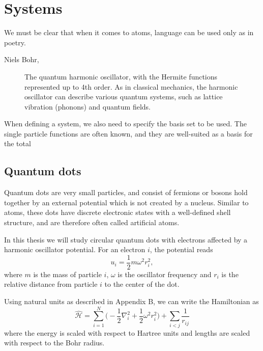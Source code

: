 \chapter{Systems} \label{chp:systems}
\epigraph{We must be clear that when it comes to atoms, language can be used only as in poetry.}{Niels Bohr, \cite{heisenberg_physics_1971}}
\begin{figure}[H]
	\centering
	
	\caption{The quantum harmonic oscillator, with the Hermite functions represented up to 4th order. As in classical mechanics, the harmonic oscillator can describe various quantum systems, such as lattice vibration (phonons) and quantum fields.}
	\label{fig:harmonicoscillator}
\end{figure}

When defining a system, we also need to specify the basis set to be used. The single particle functions are often known, and they are well-suited as a basis for the total

\newpage
\section{Quantum dots} \label{sec:quantumdots}
Quantum dots are very small particles, and consist of fermions or bosons hold together by an external potential which is not created by a nucleus. Similar to atoms, these dots have discrete electronic states with a well-defined shell structure, and are therefore often called artificial atoms. 

In this thesis we will study circular quantum dots with electrons affected by a harmonic oscillator potential. For an electron $i$, the potential reads
\begin{equation}
u_i=\frac{1}{2}m\omega^2r_i^2,
\end{equation}
where $m$ is the mass of particle $i$, $\omega$ is the oscillator frequency and $r_i$ is the relative distance from particle $i$ to the center of the dot. 

Using natural units as described in Appendix B, we can write the Hamiltonian as
\begin{equation}
\label{eq:HOHamiltonian}
\hat{\mathcal{H}} = \sum_{i=1}^{N} \Big(-\frac{1}{2} \nabla_i^2 + \frac{1}{2} \omega^2r_i ^2\Big) + \sum_{i<j} \frac{1}{r_{ij}} 
\end{equation}
where the energy is scaled with respect to Hartree units and lengths are scaled with respect to the Bohr radius.


